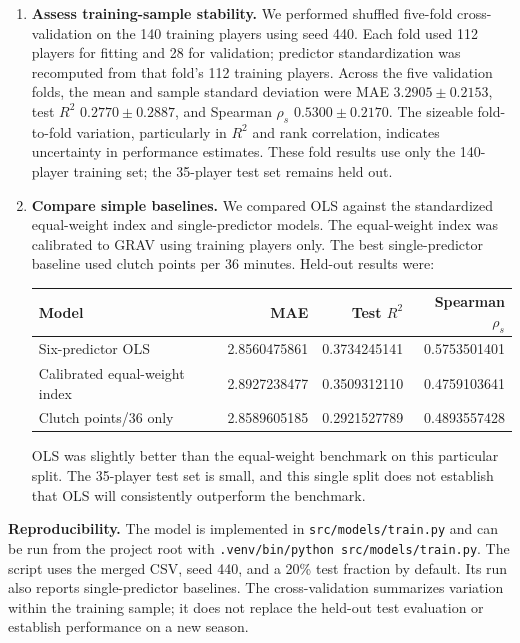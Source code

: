 \documentclass[11pt]{article}
\begin{document}
\begin{enumerate}
of assigned ranks. The held-out OLS Spearman correlation was
$\rho_s=0.5753501401$.
\item \textbf{Assess training-sample stability.} We performed shuffled
five-fold cross-validation on the 140 training players using seed 440.
Each fold used 112 players for fitting and 28 for validation; predictor
standardization was recomputed from that fold's 112 training players.
Across the five validation folds, the mean and sample standard deviation
were MAE $3.2905\pm0.2153$, test $R^2$ $0.2770\pm0.2887$, and Spearman
$\rho_s$ $0.5300\pm0.2170$. The sizeable fold-to-fold variation,
particularly in $R^2$ and rank correlation, indicates uncertainty in
performance estimates. These fold results use only the 140-player
training set; the 35-player test set remains held out.
\item \textbf{Compare simple baselines.} We compared OLS against the
standardized equal-weight index and single-predictor models. The
equal-weight index was calibrated to GRAV using training players only.
The best single-predictor baseline used clutch points per 36 minutes.
Held-out results were:
\begin{center}
\small
\begin{tabular}{@{}lrrr@{}}
\toprule
\textbf{Model} & \textbf{MAE} & \textbf{Test $R^2$} & \textbf{Spearman $\rho_s$}\\
\midrule
Six-predictor OLS & 2.8560475861 & 0.3734245141 & 0.5753501401\\
Calibrated equal-weight index & 2.8927238477 & 0.3509312110 & 0.4759103641\\
Clutch points/36 only & 2.8589605185 & 0.2921527789 & 0.4893557428\\
\bottomrule
\end{tabular}
\end{center}
OLS was slightly better than the equal-weight benchmark on this particular
split. The 35-player test set is small, and this single split does not
establish that OLS will consistently outperform the benchmark.
\end{enumerate}

\textbf{Reproducibility.} The model is implemented in
\texttt{src/models/train.py} and can be run from the project root with
\texttt{.venv/bin/python src/models/train.py}. The script uses the merged
CSV, seed 440, and a 20\% test fraction by default. Its run also reports
single-predictor baselines. The cross-validation summarizes variation
within the training sample; it does not replace the held-out test
evaluation or establish performance on a new season.
\end{document}
